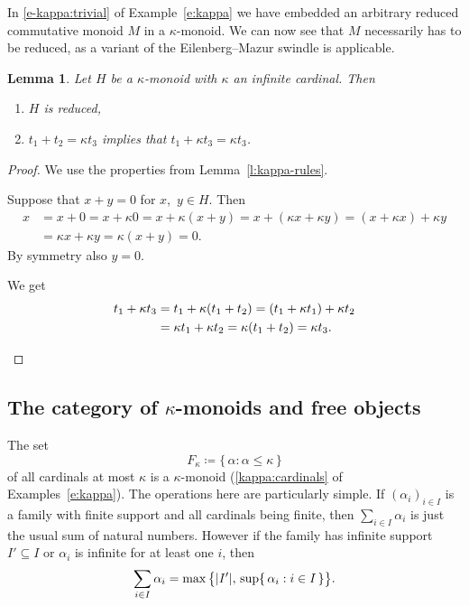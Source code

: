 \documentclass[a4paper,11pt,oneside]{amsart}
\newtheorem{lemma}[teor]{Lemma}
\theoremstyle{remark}
\DeclarePairedDelimiter{\card}{\lvert}{\rvert}
\begin{document}
In \ref{e-kappa:trivial} of Example~\ref{e:kappa} we have embedded an arbitrary reduced commutative monoid $M$ in a $\kappa$-monoid.
We can now see that $M$ necessarily has to be reduced, as a variant of the Eilenberg--Mazur swindle is applicable.

\begin{lemma} \label{infinite}
  Let $H$ be a $\kappa$-monoid with $\kappa$ an infinite cardinal. Then
  \begin{enumerate}
  \item \label{infinite:reduced} $H$ is reduced,
  \item \label{infinite:split} $t_1 + t_2 = \kappa t_3$ implies that $t_1 + \kappa t_3 = \kappa t_3$.
  \end{enumerate}
\end{lemma}

\begin{proof}
  We use the properties from Lemma~\ref{l:kappa-rules}.

  \begin{proofenumerate}
  \item[\ref{infinite:reduced}]
  Suppose that $x+y=0$ for $x$,~$y \in H$. Then
  \[
    \begin{split}
      x & = x + 0 = x + \kappa 0 = x + \kappa (x+y) = x + (\kappa x + \kappa y) = (x+ \kappa x) + \kappa y \\
      &=  \kappa x + \kappa  y =   \kappa (x + y) =  0.
    \end{split}
  \]
  By symmetry also $y=0$.

  \item[\ref{infinite:split}]
  We get
  \[
    \begin{split}
      t_1 + \kappa t_3 &= t_1 + \kappa (t_1 + t_2) =  (t_1 + \kappa t_1 ) + \kappa t_2 \\
      &=  \kappa t_1 + \kappa t_2 = \kappa (t_1 + t_2) = \kappa t_3. \qedhere
    \end{split}
  \]
  \end{proofenumerate}
\end{proof}

\subsection{The category of \texorpdfstring{$\kappa$}{κ}-monoids and free objects} The set
\[
  F_{\kappa} \coloneqq \{\, \alpha : \alpha \le \kappa \,\}
\]
of all cardinals at most $\kappa$ is a $\kappa$-monoid (\ref{kappa:cardinals} of Examples~\ref{e:kappa}).
The operations here are particularly simple.
If $(\alpha_i)_{i \in I}$ is a family with finite support and all cardinals being finite, then $\sum_{i \in I} \alpha_i$ is just the usual sum of natural numbers.
However if the family has infinite support $I' \subseteq I$ or $\alpha_i$ is infinite for at least one $i$, then
\[
  \sum_{i\in I} \alpha_i = \max\big\{ \card{I'},\, \sup\{\, \alpha_i : i \in I \,\} \big\}.
\]
\end{document}
